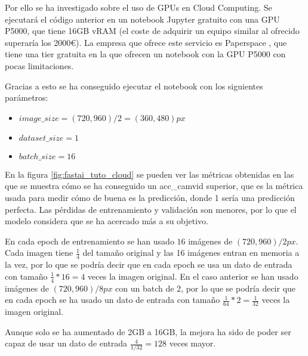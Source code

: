 Por ello se ha investigado sobre el uso de GPUs en Cloud Computing. Se ejecutará el código anterior en un notebook Jupyter gratuito con una GPU P5000, que tiene 16GB vRAM (el coste de adquirir un equipo similar al ofrecido superaría los 2000€). La empresa que ofrece este servicio es Paperspace \cite{Paperspace2020}, que tiene una tier gratuita en la que ofrecen un notebook con la GPU P5000 con pocas limitaciones.

Gracias a esto se ha conseguido ejecutar el notebook con los siguientes parámetros:

\begin{itemize}
\item $image\_size = (720, 960) / 2 = (360, 480)px$
\item $dataset\_size = 1$
\item $batch\_size = 16$
\end{itemize}


En la figura \ref{fig:fastai_tuto_cloud} se pueden ver las métricas obtenidas en las que se muestra cómo se ha conseguido un acc\_camvid superior, que es la métrica usada para medir cómo de buena es la predicción, donde 1 sería una predicción perfecta. Las pérdidas de entrenamiento y validación son menores, por lo que el modelo considera que se ha acercado más a su objetivo.

En cada epoch de entrenamiento se han usado $16$ imágenes de $(720, 960) / 2px$. Cada imagen tiene $\frac{1}{4}$ del tamaño original y las 16 imágenes entran en memoria a la vez, por lo que se podría decir que en cada epoch se usa un dato de entrada con tamaño $\frac{1}{4}*16=4$ veces la imagen original. En el caso anterior se han usado imágenes de $(720, 960) / 8 px$ con un batch de 2, por lo que se podría decir que en cada epoch se ha usado un dato de entrada con tamaño $\frac{1}{64}*2=\frac{1}{32}$ veces la imagen original.

Aunque solo se ha aumentado de 2GB a 16GB, la mejora ha sido de poder ser capaz de usar un dato de entrada $\frac{4}{1/32} = 128$ veces mayor.